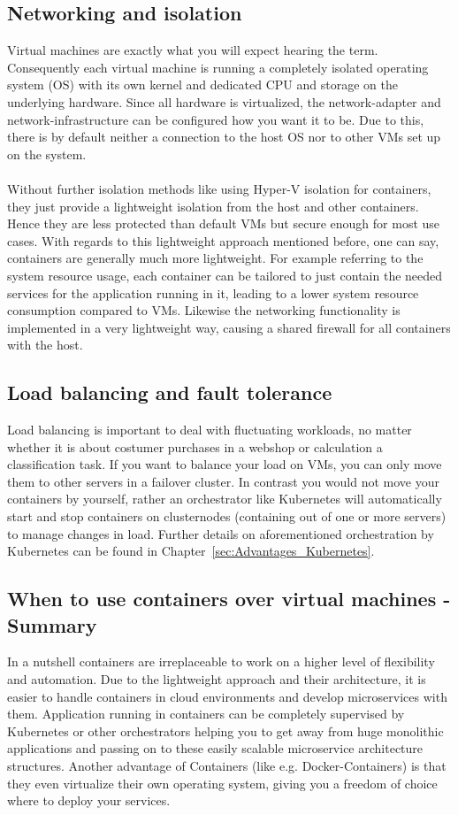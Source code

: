 \subsection{Networking and isolation}
Virtual machines are exactly what you will expect hearing the term. Consequently each virtual machine is running a completely isolated operating system (OS) with its own kernel and dedicated CPU and storage on the underlying hardware. Since all hardware is virtualized, the network-adapter and network-infrastructure can be configured how you want it to be. Due to this, there is by default neither a connection to the host OS nor to other VMs set up on the system.\cite{Microsoft:2021}
\\\\Without further isolation methods like using Hyper-V isolation for containers, they just provide a lightweight isolation from the host and other containers. Hence they are less protected than default VMs but secure enough for most use cases. With regards to this lightweight approach mentioned before, one can say, containers are generally much more lightweight. For example referring to the system resource usage, each container can be tailored to just contain the needed services for the application running in it, leading to a lower system resource consumption compared to VMs. Likewise the networking functionality is implemented in a very lightweight way, causing a shared firewall for all containers with the host.\cite{Microsoft:2021}
\subsection{Load balancing and fault tolerance}
Load balancing is important to deal with fluctuating workloads, no matter whether it is about costumer purchases in a webshop or calculation a classification task. If you want to balance your load on VMs, you can only move them to other servers in a failover cluster. In contrast you would not move your containers by yourself, rather an orchestrator like Kubernetes will automatically start and stop containers on clusternodes (containing out of one or more servers) to manage changes in load. Further details on aforementioned orchestration by Kubernetes can be found in Chapter~\ref{sec:Advantages_Kubernetes}.\cite{Microsoft:2021}
\subsection{When to use containers over virtual machines - Summary}
In a nutshell containers are irreplaceable to work on a higher level of flexibility and auto\-mation. Due to the lightweight approach and their architecture, it is easier to handle containers in cloud environments and develop microservices with them. Application running in containers can be completely supervised by Kubernetes or other orchestrators helping you to get away from huge monolithic applications and passing on to these easily scalable microservice architecture structures. Another advantage of Containers (like e.g. Docker-Containers) is that they even virtualize their own operating system, giving you a freedom of choice where to deploy your services.\cite{Microsoft:2021,IBM:2021,SFL:2017}



